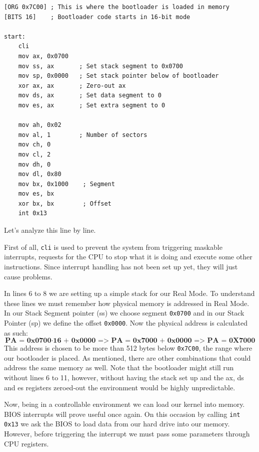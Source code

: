 \begin{lstlisting}[caption={Simple bootloader start in assembly}]
[ORG 0x7C00] ; This is where the bootloader is loaded in memory
[BITS 16]    ; Bootloader code starts in 16-bit mode

start:
    cli
    mov ax, 0x0700
    mov ss, ax       ; Set stack segment to 0x0700
    mov sp, 0x0000   ; Set stack pointer below of bootloader
    xor ax, ax       ; Zero-out ax
    mov ds, ax       ; Set data segment to 0
    mov es, ax       ; Set extra segment to 0

    mov ah, 0x02
    mov al, 1        ; Number of sectors
    mov ch, 0
    mov cl, 2
    mov dh, 0
    mov dl, 0x80
    mov bx, 0x1000    ; Segment
    mov es, bx
    xor bx, bx        ; Offset
    int 0x13
\end{lstlisting}
    
Let's analyze this line by line. 

First of all, \texttt{cli} is used to prevent the system from triggering maskable interrupts,
requests for the CPU to stop what it is doing and execute some other instructions.
Since interrupt handling has not been set up yet, they will just cause problems.

In lines 6 to 8 we are setting up a simple stack for our Real Mode. To understand these lines we must
remember how physical memory is addressed in Real Mode. In our Stack Segment pointer (ss) we choose segment \texttt{0x0700}
and in our Stack Pointer (sp) we define the offset \texttt{0x0000}. Now the physical address is calculated as such:
\[
\textbf{PA = 0x0700} \cdot \textbf{16 + 0x0000}
\textbf{ => PA = 0x7000 + 0x0000}
\textbf{    => PA = 0X7000}
\]
This address is chosen to be more than 512 bytes below \texttt{0x7C00}, the range where our bootloader is placed.
As mentioned, there are other combinations that could address the same memory as well.
Note that the bootloader might still run without lines 6 to 11, however, without having the stack set up
and the ax, ds and es registers zeroed-out the environment would be highly unpredictable.

Now, being in a controllable environment we can load our kernel into memory. BIOS interrupts will prove useful once again.
On this occasion by calling \texttt{int 0x13} we ask the BIOS to load data from our hard drive into our memory. 
However, before triggering the interrupt we must pass some parameters through CPU registers.

